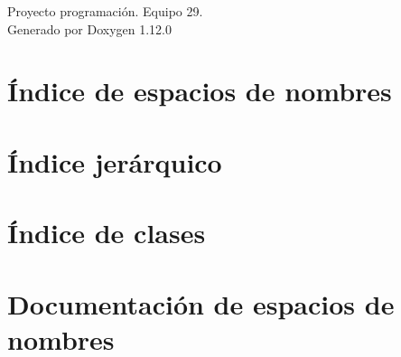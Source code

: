 \documentclass[twoside]{book}
\newcommand{\+}{\discretionary{\mbox{\scriptsize$\hookleftarrow$}}{}{}}
\newcommand{\clearemptydoublepage}{%
    \newpage{\pagestyle{empty}\cleardoublepage}%
  }
\begin{document}
  \raggedbottom
    \hypersetup{pageanchor=false,
                bookmarksnumbered=true,
                pdfencoding=unicode
               }
  \begin{titlepage}
  \vspace*{7cm}
  \begin{center}%
  {\Large Proyecto programación. Equipo 29.}\\
  \vspace*{1cm}
  {\large Generado por Doxygen 1.12.0}\\
  \end{center}
  \end{titlepage}
  \clearemptydoublepage
  \tableofcontents
  \clearemptydoublepage
  \hypersetup{pageanchor=true}

\chapter{Índice de espacios de nombres}

\chapter{Índice jerárquico}

\chapter{Índice de clases}

\chapter{Documentación de espacios de nombres}











\end{document}
